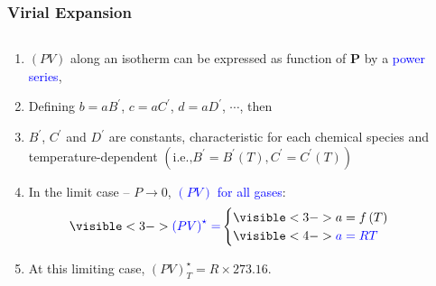 \documentclass[10pt,compress]{beamer}
\begin{document}
\scriptsize
\begin{frame}
 \frametitle{Virial Expansion}
   \begin{columns}
    \begin{column}[l]{0.5\linewidth}
      \begin{enumerate} \scriptsize
        \item<1-> $\left(PV\right)$ along an isotherm can be expressed as function of {\bf P} by a \textcolor{blue}{power series},
        \item<2-> Defining $b=aB^{\prime}$, $c=aC^{\prime}$, $d=aD^{\prime}$, $\cdots$, then
        \item<2-> $B^{\prime}$, $C^{\prime}$ and $D^{\prime}$ are constants, characteristic for each chemical species and temperature-dependent $\left(\text{i.e.,} B^{\prime}=B^{\prime}(T), C^{\prime}=C^{\prime}(T)\right)$  
        \item<3-> In the limit case -- $P\rightarrow 0$, \textcolor{blue}{$\left(PV\right)$ for all gases}:\\
           \begin{displaymath}
              \visible<3->{\textcolor{blue}{\left(PV\right)^{\star} =}} 
                   \begin{cases}
                      \visible<3->{a = f\left(T\right)} \\
                      \visible<4->{\textcolor{blue}{a= RT}}\\ 
                   \end{cases}
           \end{displaymath}
        \item<5-> At this limiting case, $\left(PV\right)_{T}^{\star} = R \times 273.16$. 
      \end{enumerate}
    \end{column}
    \begin{column}[l]{0.5\linewidth}\scriptsize
     \begin{enumerate}\setcounter{enumi}{5}

\end{enumerate}
\end{column}
\end{columns}
\end{frame}
\end{document}
